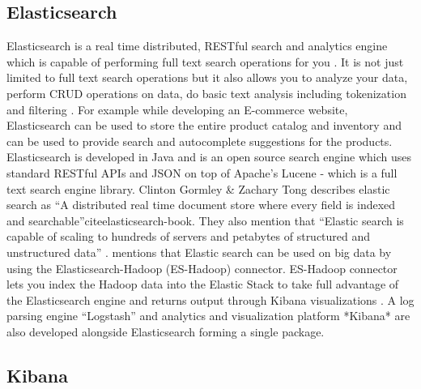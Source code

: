     \pv
	
\subsection{Elasticsearch}

    Elasticsearch is a real time
    distributed, RESTful search and analytics engine which is capable
    of performing full text search operations for you \cite{www-elasticsearch}.
    It is not just limited to full text search operations but it also allows you to
    analyze your data, perform CRUD operations on data, do basic text
    analysis including tokenization and
    filtering \cite{www-elasticsearch-intro}. For example while
    developing an E-commerce website, Elasticsearch can be used to
    store the entire product catalog and inventory and can be used to
    provide search and autocomplete suggestions for the
    products. Elasticsearch is developed in Java and is an open source
    search engine which uses standard RESTful APIs and JSON on
    top of Apache's Lucene - which is a full text search engine
    library. Clinton Gormley \& Zachary Tong
    describes elastic search as ``A distributed real time document
    store where every field is indexed and
    searchable''cite{elasticsearch-book}. They also
    mention that ``Elastic search is capable of scaling to hundreds of
    servers and petabytes of structured and unstructured
    data'' \cite{www-elasticsearch-hadoop}. mentions that Elastic
    search can be used on big data by using the Elasticsearch-Hadoop
    (ES-Hadoop) connector. ES-Hadoop connector lets you index the
    Hadoop data into the Elastic Stack to take full advantage of the
    Elasticsearch engine and returns output through Kibana
    visualizations \cite{www-wikipedia-elasticsearch}. A log parsing
    engine ``Logstash'' and analytics and visualization platform
    *Kibana* are also developed alongside Elasticsearch forming a
    single package.

    \pv
    
\subsection{Kibana}

